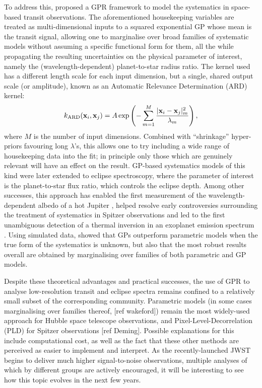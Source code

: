 \documentclass[letterpaper]{ar-1col}
\begin{document}
To address this, \citet{2012MNRAS.419.2683G} proposed a GPR framework to model the systematics in space-based transit observations. The aforementioned housekeeping variables are treated as multi-dimensional inputs to a squared exponential GP whose mean is the transit signal, allowing one to marginalise over broad families of systematic models without assuming a specific functional form for them, all the while propagating the resulting uncertainties on the physical parameter of interest, namely the (wavelength-dependent) planet-to-star radius ratio. The kernel used has a different length scale for each input dimension, but a single, shared output scale (or amplitude), known as an Automatic Relevance Determination (ARD) kernel:
\begin{equation}
    k_{\rm ARD}(\mathbf{x}_i, \mathbf{x}_j) = A \exp \left( - \sum_{m=1}^M \frac{|\mathbf{x}_i-\mathbf{x}_j|_m^2}{\lambda_m} \right),
\end{equation}
where $M$ is the number of input dimensions. Combined with ``shrinkage'' hyper-priors favouring long $\lambda$'s, this allows one to try including a wide range of housekeeping data into the fit; in principle only those which are genuinely relevant will have an effect on the result. 
GP-based systematics models of this kind were later extended to eclipse spectroscopy, where the parameter of interest is the planet-to-star flux ratio, which controls the eclipse depth. Among other successes, this approach has enabled the first measurement of the wavelength-dependent albedo of a hot Jupiter \citep{2013ApJ...772L..16E}, helped resolve early controversies surrounding the treatment of systematics in Spitzer observations \citep{2015MNRAS.451..680E} and
led to the first unambiguous detection of a thermal inversion in an exoplanet emission spectrum \citep{2017Natur.548...58E}. Using simulated data, \citet{2014MNRAS.445.3401G} showed that GPs outperform parametric models when the true form of the systematics is unknown, but also that the most robust results overall are obtained by marginalising over families of both parametric and GP models.

Despite these theoretical advantages and practical successes, the use of GPR to analyse low-resolution transit and eclipse spectra remains confined to a relatively small subset of the corresponding community. Parametric models (in some cases marginalising over families thereof, [ref wakeford]) remain the most widely-used approach for Hubble space telescope observations, and Pixel-Level-Decorrelation (PLD) for Spitzer observations [ref Deming]. Possible explanations for this include computational cost, as well as the fact that these other methods are perceived as easier to implement and interpret. As the recently-launched JWST begins to deliver much higher signal-to-noise observations, multiple analyses of which by different groups are actively encouraged, it will be interesting to see how this topic evolves in the next few years.
\end{document}
